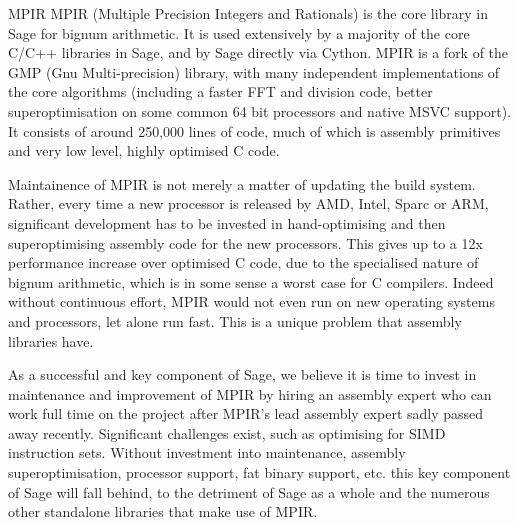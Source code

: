 \begin{Workpackage}{\thewpno}
\begin{task}{MPIR}
  \label{task:hpc_singular}
MPIR (Multiple Precision Integers and Rationals) is the core library in Sage
for bignum arithmetic. It is used extensively by a majority of the core C/C++
libraries in Sage, and by Sage directly via Cython. MPIR is a fork of the 
GMP (Gnu Multi-precision) library, with many independent implementations of the
core algorithms (including a faster FFT and division code, better 
superoptimisation on some common 64 bit processors and native MSVC support). 
It consists of around 250,000 lines of code, much of which is assembly 
primitives and very low level, highly optimised C code.

Maintainence of MPIR is not merely a matter of updating the build system.
Rather, every time a new processor is released by AMD, Intel, Sparc or ARM,
significant development has to be invested in hand-optimising and then
superoptimising assembly code for the new processors. This gives up to a 12x
performance increase over optimised C code, due to the specialised nature of
bignum arithmetic, which is in some sense a worst case for C compilers. Indeed
without continuous effort, MPIR would not even run on new operating systems and
processors, let alone run fast. This is a unique problem that assembly libraries
have.

As a successful and key component of Sage, we believe it is time to invest in
maintenance and improvement of MPIR by hiring an assembly expert who can work
full time on the project after MPIR's lead assembly expert sadly passed
away recently. Significant challenges exist, such as
optimising for SIMD instruction sets. Without investment into maintenance,
assembly superoptimisation, processor support, fat binary support, etc. this key
component of Sage will fall behind, to the detriment of Sage as a whole and the
numerous other standalone libraries that make use of MPIR.

\begin{WPDeliverables}
\end{WPDeliverables}
\end{task}



\end{Workpackage}
